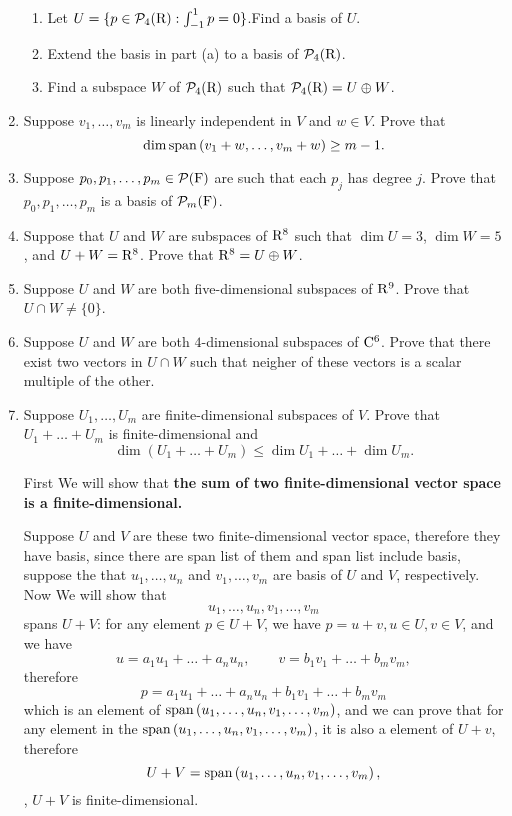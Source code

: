 \begin{enumerate}
\begin{enumerate}[label=(\alph*)]
            \item Let $U = \{p \in \mathcal{P}_4(\mathrm{R}):\int_{-1}^{1} p =0\}$.Find a basis of $U$.
            \item Extend the basis in part (a) to a basis of $\mathcal{P}_4(\mathrm{R})$.
            \item Find a subspace $W$ of $\mathcal{P}_4(\mathrm{R})$ such that $\mathcal{P}_4(\mathrm{R}) = U \oplus W$.
        \end{enumerate}
    \item Suppose $v_1,\ldots,v_m$ is linearly independent in $V$ and $w \in V$. Prove that 
        \[ \dim{\text{span}\left(v_1+w,\ldots,v_m+w\right)} \geq m - 1.\]
    \item Suppose $p_0,p_1,\ldots,p_m \in \mathcal{P}(\mathrm{F})$ are such that each $p_j$ has degree $j$. Prove that 
        $p_0,p_1,\ldots,p_m$ is a basis of $\mathcal{P}_m(\mathrm{F})$.
    \item Suppose that $U$ and $W$ are subspaces of $\mathrm{R}^8$ such that $\dim{U} = 3$, $\dim{W} = 5$, and 
        $U + W = \mathrm{R}^8$. Prove that $\mathrm{R}^8 = U \oplus W$.
    \item Suppose $U$ and $W$ are both five-dimensional subspaces of $\mathrm{R}^9$. Prove that $U \cap W \neq \{0\}$.
    \item Suppose $U$ and $W$ are both $4$-dimensional subspaces of $\mathrm{C}^6$. Prove that there exist two vectors 
        in $U \cap W$ such that neigher of these vectors is a scalar multiple of the other.
    \item Suppose $U_1, \ldots, U_m$ are finite-dimensional subspaces of $V$. Prove that 
        $U_1 + \dots + U_m$ is finite-dimensional and 
        \[ \dim{(U_1 + \dots + U_m)} \leq \dim{U_1} + \dots + \dim{U_m}. \]
        \begin{solution}
            First We will show that \textbf{the sum of two finite-dimensional vector space is a finite-dimensional.}

            Suppose $U$ and $V$ are these two finite-dimensional vector space, therefore they have basis, since there are span list of them and
            span list include basis, suppose the that $u_1, \ldots, u_n$ and $v_1, \ldots, v_m$ are basis of $U$ and $V$, respectively. Now We will 
            show that 
            \[ u_1, \ldots, u_n, v_1, \ldots, v_m \]
            spans $U+V$: for any element $p \in U+V$, we have $p = u+v, u \in U, v \in V$, and we have 
            \[ u = a_1u_1 + \dots + a_nu_n, \qquad v = b_1v_1 + \dots + b_mv_m ,\]
            therefore 
            \[ p = a_1u_1 + \dots + a_nu_n + b_1v_1 + \dots + b_mv_m \]
            which is an element of $\text{span}\left(u_1, \ldots, u_n, v_1, \ldots, v_m\right)$, and we can prove that for any element 
            in the $\text{span}\left(u_1, \ldots, u_n, v_1, \ldots, v_m\right)$, it is also a element of $U + v$, therefore 
            \[ U+V = \text{span}\left(u_1, \ldots, u_n, v_1, \ldots, v_m\right),\]
            \ie, $U +V$ is finite-dimensional.


\end{solution}
\end{enumerate}
